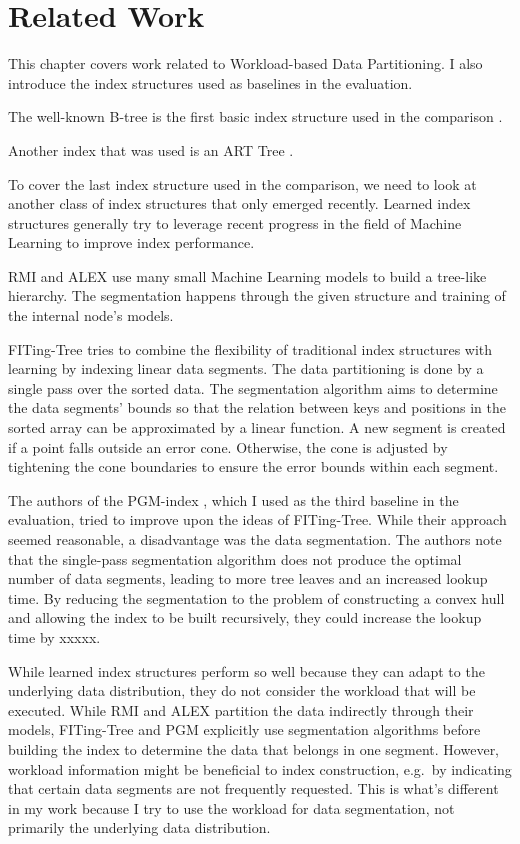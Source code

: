 \thispagestyle{plain}
\chapter{Related Work}

This chapter covers work related to Workload-based Data Partitioning. I also introduce the index structures used as baselines in the evaluation.

The well-known B-tree is the first basic index structure used in the comparison \cite{Bayer1970-rh}.

Another index that was used is an ART Tree \cite{Leis2013}.

To cover the last index structure used in the comparison, we need to look at another class of index structures that only emerged recently. Learned index structures generally try to leverage recent progress in the field of Machine Learning to improve index performance.

RMI \cite{Kraska2018} and ALEX \cite{Ding2020} use many small Machine Learning models to build a tree-like hierarchy. The segmentation happens through the given structure and training of the internal node's models.

FITing-Tree \cite{Galakatos2019} tries to combine the ﬂexibility of traditional index structures with learning by indexing linear data segments. The data partitioning is done by a single pass over the sorted data. The segmentation algorithm aims to determine the data segments' bounds so that the relation between keys and positions in the sorted array can be approximated by a linear function. A new segment is created if a point falls outside an error cone. Otherwise, the cone is adjusted by tightening the cone boundaries to ensure the error bounds within each segment.

The authors of the PGM-index \cite{Ferragina:2020pgm}, which I used as the third baseline in the evaluation, tried to improve upon the ideas of FITing-Tree. While their approach seemed reasonable, a disadvantage was the data segmentation. The authors note that the single-pass segmentation algorithm does not produce the optimal number of data segments, leading to more tree leaves and an increased lookup time. By reducing the segmentation to the problem of constructing a convex hull and allowing the index to be built recursively, they could increase the lookup time by xxxxx.

While learned index structures perform so well because they can adapt to the underlying data distribution, they do not consider the workload that will be executed. While RMI and ALEX partition the data indirectly through their models, FITing-Tree and PGM explicitly use segmentation algorithms before building the index to determine the data that belongs in one segment. However, workload information might be beneficial to index construction, e.g.~by indicating that certain data segments are not frequently requested. This is what's different in my work because I try to use the workload for data segmentation, not primarily the underlying data distribution.

